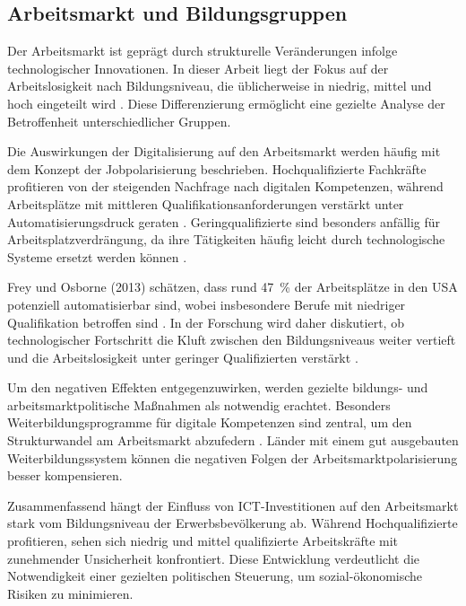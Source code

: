 
\subsection{Arbeitsmarkt und Bildungsgruppen}

Der Arbeitsmarkt ist geprägt durch strukturelle Veränderungen infolge technologischer 
Innovationen. In dieser Arbeit liegt der Fokus auf der Arbeitslosigkeit nach Bildungsniveau, 
die üblicherweise in niedrig, mittel und hoch eingeteilt wird \parencite[S. 35–37]{frey2013thefuture}. 
Diese Differenzierung ermöglicht eine gezielte Analyse der Betroffenheit unterschiedlicher Gruppen.

Die Auswirkungen der Digitalisierung auf den Arbeitsmarkt werden häufig mit dem Konzept der 
Jobpolarisierung beschrieben. Hochqualifizierte Fachkräfte profitieren von der steigenden 
Nachfrage nach digitalen Kompetenzen, während Arbeitsplätze mit mittleren Qualifikationsanforderungen 
verstärkt unter Automatisierungsdruck geraten \parencite[S. 40]{autor2015whyare}. Geringqualifizierte 
sind besonders anfällig für Arbeitsplatzverdrängung, da ihre Tätigkeiten häufig leicht durch 
technologische Systeme ersetzt werden können \parencite[S. 10]{acemoglu2002technical}.

Frey und Osborne (2013) schätzen, dass rund 47~\% der Arbeitsplätze in den USA potenziell 
automatisierbar sind, wobei insbesondere Berufe mit niedriger Qualifikation betroffen sind 
\parencite[vgl.][S. 14–15]{frey2013thefuture}. In der Forschung wird daher diskutiert, ob 
technologischer Fortschritt die Kluft zwischen den Bildungsniveaus weiter vertieft und die 
Arbeitslosigkeit unter geringer Qualifizierten verstärkt \parencite[S. 2–4]{balsmeier2019isthis}.

Um den negativen Effekten entgegenzuwirken, werden gezielte bildungs- und arbeitsmarktpolitische 
Maßnahmen als notwendig erachtet. Besonders Weiterbildungsprogramme für digitale Kompetenzen 
sind zentral, um den Strukturwandel am Arbeitsmarkt abzufedern \parencite[S. 75]{brynjolfsson2014thesecond}. 
Länder mit einem gut ausgebauten Weiterbildungssystem können die negativen Folgen der 
Arbeitsmarktpolarisierung besser kompensieren.

Zusammenfassend hängt der Einfluss von \ac{ICT}-Investitionen auf den Arbeitsmarkt stark vom 
Bildungsniveau der Erwerbsbevölkerung ab. Während Hochqualifizierte profitieren, sehen sich 
niedrig und mittel qualifizierte Arbeitskräfte mit zunehmender Unsicherheit konfrontiert. Diese 
Entwicklung verdeutlicht die Notwendigkeit einer gezielten politischen Steuerung, um 
sozial-ökonomische Risiken zu minimieren.
